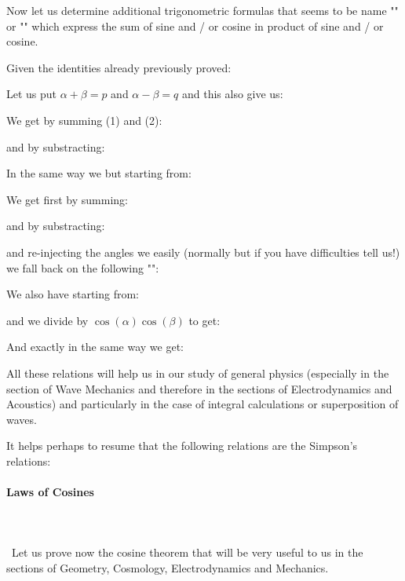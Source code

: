 	Now let us determine additional trigonometric formulas that seems to be name "" or "" which express the sum of sine and / or cosine in product of sine and / or cosine.
	
	Given the identities already previously proved:
	
	Let us put $\alpha+\beta=p$ and $\alpha-\beta=q$ and this also give us:
	
	We get by summing (1) and (2):
	
	and by substracting:
	
	In the same way we but starting from:
	
	We get first by summing:
	
	and by substracting:
	
	and re-injecting the angles we easily (normally but if you have difficulties tell us!) we fall back on the following "":
	
	
	We also have starting from:	
	
	and we divide by $\cos(\alpha)\cos(\beta)$ to get:
	
	And exactly in the same way we get:
	
	
	All these relations will help us in our study of general physics (especially in the section of Wave Mechanics and therefore in the sections of Electrodynamics and Acoustics) and particularly in the case of integral calculations or superposition of waves.
	
	\begin{tcolorbox}[title=Remark,colframe=black,arc=10pt]
It helps perhaps to resume that the following relations are the Simpson's relations:
	
	\end{tcolorbox}
	
	\paragraph{Laws of Cosines}\label{law of cosines}\mbox{}\\\\\
	Let us prove now the cosine theorem that will be very useful to us in the sections of Geometry, Cosmology, Electrodynamics and Mechanics.
	
